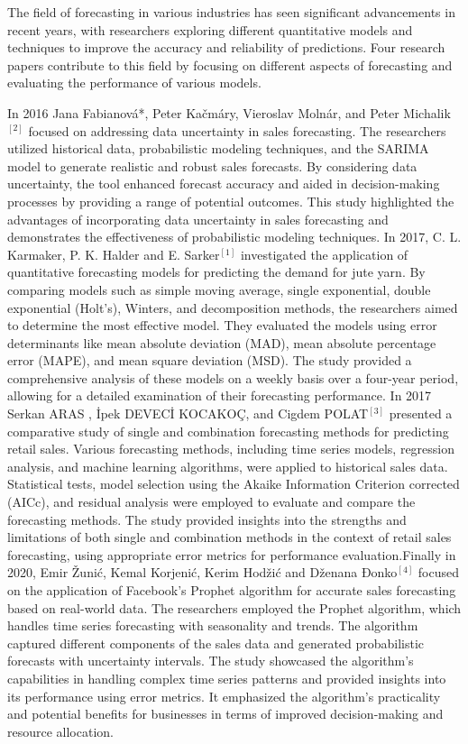\documentclass[
]{article}
\begin{document}
The field of forecasting in various industries has seen significant
advancements in recent years, with researchers exploring different
quantitative models and techniques to improve the accuracy and
reliability of predictions. Four research papers contribute to this
field by focusing on different aspects of forecasting and evaluating the
performance of various models.

In 2016 Jana Fabianová*, Peter Kačmáry, Vieroslav Molnár, and Peter
Michalik\(^{[2]}\) focused on addressing data uncertainty in sales
forecasting. The researchers utilized historical data, probabilistic
modeling techniques, and the SARIMA model to generate realistic and
robust sales forecasts. By considering data uncertainty, the tool
enhanced forecast accuracy and aided in decision-making processes by
providing a range of potential outcomes. This study highlighted the
advantages of incorporating data uncertainty in sales forecasting and
demonstrates the effectiveness of probabilistic modeling techniques. In
2017, C. L. Karmaker, P. K. Halder and E. Sarker\(^{[1]}\) investigated
the application of quantitative forecasting models for predicting the
demand for jute yarn. By comparing models such as simple moving average,
single exponential, double exponential (Holt's), Winters, and
decomposition methods, the researchers aimed to determine the most
effective model. They evaluated the models using error determinants like
mean absolute deviation (MAD), mean absolute percentage error (MAPE),
and mean square deviation (MSD). The study provided a comprehensive
analysis of these models on a weekly basis over a four-year period,
allowing for a detailed examination of their forecasting performance. In
2017 Serkan ARAS , İpek DEVECİ KOCAKOÇ, and Cigdem POLAT\(^{[3]}\)
presented a comparative study of single and combination forecasting
methods for predicting retail sales. Various forecasting methods,
including time series models, regression analysis, and machine learning
algorithms, were applied to historical sales data. Statistical tests,
model selection using the Akaike Information Criterion corrected (AICc),
and residual analysis were employed to evaluate and compare the
forecasting methods. The study provided insights into the strengths and
limitations of both single and combination methods in the context of
retail sales forecasting, using appropriate error metrics for
performance evaluation.Finally in 2020, Emir Žunić, Kemal Korjenić,
Kerim Hodžić and Dženana Đonko\(^{[4]}\) focused on the application of
Facebook's Prophet algorithm for accurate sales forecasting based on
real-world data. The researchers employed the Prophet algorithm, which
handles time series forecasting with seasonality and trends. The
algorithm captured different components of the sales data and generated
probabilistic forecasts with uncertainty intervals. The study showcased
the algorithm's capabilities in handling complex time series patterns
and provided insights into its performance using error metrics. It
emphasized the algorithm's practicality and potential benefits for
businesses in terms of improved decision-making and resource allocation.
\end{document}
